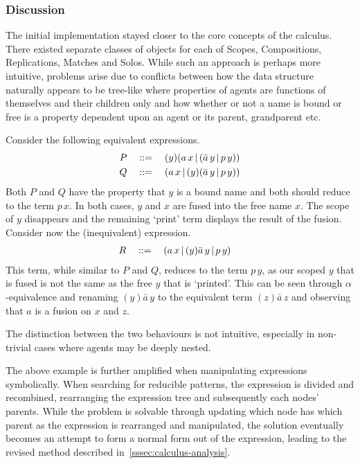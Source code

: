     \subsubsection{Discussion}
        The initial implementation stayed closer to the core concepts of the calculus.
        There existed separate classes of objects for each of Scopes, Compositions, Replications, Matches and Solos.
        While such an approach is perhaps more intuitive, problems arise due to conflicts between how the data structure naturally appears to be tree-like where properties of agents are functions of themselves and their children only and how whether or not a name is bound or free is a property dependent upon an agent or its parent, grandparent etc.

        \begin{example*}
            Consider the following equivalent expressions.
            \begin{align*}
                P \quad & ::= \quad (y)(a \, x \,|\, (\bar{a} \, y \,|\, p \, y)) \\
                Q \quad & ::= \quad (a \, x \,|\, (y)(\bar{a} \, y \,|\, p \, y))
            \end{align*}
            Both $P$ and $Q$ have the property that $y$ is a bound name and both should reduce to the term $p \, x$.
            In both cases, $y$ and $x$ are fused into the free name $x$. The scope of $y$ disappears and the remaining `print' term displays the result of the fusion.
            Consider now the (inequivalent) expression.
            \begin{align*}
                R \quad & ::= \quad (a \, x \, | \, (y)\bar{a} \, y \, | \, p \, y)
            \end{align*}
            This term, while similar to $P$ and $Q$, reduces to the term $p \, y$, as our scoped $y$ that is fused is not the same as the free $y$ that is `printed'.
            This can be seen through $\alpha$-equivalence and renaming $(y)\bar{a} \, y$ to the equivalent term $(z)\bar{a} \, z$ and observing that $a$ is a fusion on $x$ and $z$.

            The distinction between the two behaviours is not intuitive, especially in non-trivial cases where agents may be deeply nested.
        \end{example*}

        The above example is further amplified when manipulating expressions symbolically.
        When searching for reducible patterns, the expression is divided and recombined, rearranging the expression tree and subsequently each nodes' parents.
        While the problem is solvable through updating which node has which parent as the expression is rearranged and manipulated, the solution eventually becomes an attempt to form a normal form out of the expression, leading to the revised method described in~\ref{sssec:calculus-analysis}.
